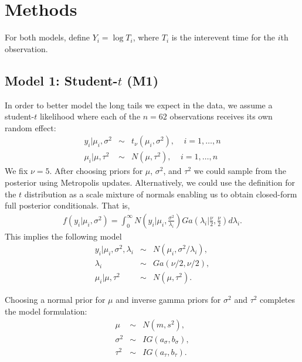 \documentclass{asaproc}
\begin{document}
\section{Methods}

For both models, define $Y_i=\log T_i$, where $T_i$ is the interevent time for the $i$th observation.

\subsection{Model 1: Student-$t$ (M1)}

In order to better model the long tails we expect in the data, we assume a student-$t$ likelihood where each of the $n=62$ observations receives its own random effect:
\begin{eqnarray*}
y_i|\mu_i,\sigma^2 &\sim& t_\nu(\mu_i, \sigma^2),~~~~~i=1,\ldots,n \\
\mu_i|\mu,\tau^2 &\sim& N(\mu, \tau^2),~~~~~i=1,\ldots,n
\end{eqnarray*}
We fix $\nu=5$. After choosing priors for $\mu$, $\sigma^2$, and $\tau^2$ we could sample from the posterior using Metropolis updates. Alternatively, we could use the definition for the $t$ distribution as a scale mixture of normals enabling us to obtain closed-form full posterior conditionals. That is,
\begin{eqnarray*}
f(y_i|\mu_i,\sigma^2) = \int_0^\infty N\left(y_i|\mu_i, \frac{\sigma^2}{\lambda_i}\right)Ga\left(\lambda_i|\frac{\nu}{2},\frac{\nu}{2}\right)d\lambda_i.
\end{eqnarray*}
This implies the following model
\begin{eqnarray*}
y_i|\mu_i,\sigma^2,\lambda_i &\sim& N(\mu_i, \sigma^2/\lambda_i), \\
\lambda_i &\sim& Ga(\nu/2, \nu/2), \\
\mu_i|\mu,\tau^2 &\sim& N(\mu, \tau^2).
\end{eqnarray*}

Choosing a normal prior for $\mu$ and inverse gamma priors for $\sigma^2$ and $\tau^2$ completes the model formulation:
\begin{eqnarray*}
\mu &\sim& N(m, s^2), \\
\sigma^2 &\sim& IG(a_\sigma, b_\sigma), \\
\tau^2 &\sim& IG(a_\tau, b_\tau).
\end{eqnarray*}
\end{document}
